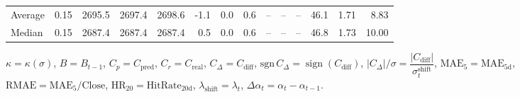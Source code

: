 \begin{threeparttable}
{\begin{tabular}{lrrrrrrrrrrrrr}
Average &     0.15 & 2695.5 & 2697.4 & 2698.6 &       -1.1 &                      0.0 &                 0.6 &         -- &        -- &             -- &             46.1 &            1.71 &                   8.83 \\
 Median &     0.15 & 2687.4 & 2687.4 & 2687.4 &        0.5 &                      0.0 &                 0.6 &         -- &        -- &             -- &             46.8 &            1.73 &                  10.00 \\
\bottomrule
\end{tabular}
}
\begin{tablenotes}\footnotesize
\item $\kappa=\kappa(\sigma)$, $B=B_{t-1}$, $C_p=C_{\text{pred}}$, $C_r=C_{\text{real}}$, $C_\Delta=C_{\text{diff}}$, $\mathrm{sgn}\,C_\Delta=\operatorname{sign}(C_{\text{diff}})$, $|C_\Delta|/\sigma=\dfrac{|C_{\text{diff}}|}{\sigma_t^{\text{shift}}}$, $\mathrm{MAE}_5=\mathrm{MAE}_{5\text{d}}$, $\mathrm{RMAE}= \mathrm{MAE}_5 / \text{Close}$, $\mathrm{HR}_{20}=\mathrm{HitRate}_{20\text{d}}$, 
$\lambda_{\text{shift}}=\lambda_t$, 
$\Delta\alpha_t=\alpha_t-\alpha_{t-1}$.
\end{tablenotes}
\end{threeparttable}
\endgroup

